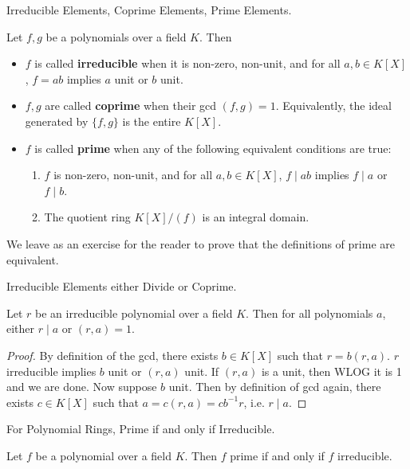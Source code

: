 \documentclass[../../book.tex]{subfiles}
\begin{document}
\begin{dfn} Irreducible Elements, Coprime Elements, Prime Elements.
    
    Let $f, g$ be a polynomials over a field $K$. 
    Then \begin{itemize}
        \item $f$ is called \textbf{irreducible} when it is non-zero, non-unit, and
            for all $a, b \in K[X]$, $f = a b$ implies $a$ unit or $b$ unit.
        \item $f, g$ are called \textbf{coprime} when their gcd $(f,g) = 1$.
            Equivalently, the ideal generated by $\{f,g\}$ is the entire $K[X]$.
        \item $f$ is called \textbf{prime} when any of the following 
            equivalent conditions are true: 
            \begin{enumerate}
                \item $f$ is non-zero, non-unit, and for all $a, b \in K[X]$, 
                $f \mid ab$ implies $f \mid a$ or $f \mid b$.
                \item The quotient ring $K[X]/(f)$ is an integral domain.
            \end{enumerate}
    \end{itemize}
    We leave as an exercise for the reader to prove that
    the definitions of prime are equivalent. 
\end{dfn}
\begin{lem} Irreducible Elements either Divide or Coprime.
    
    Let $r$ be an irreducible polynomial over a field $K$.
    Then for all polynomials $a$, either $r \mid a$ or $(r,a) = 1$.
\end{lem}
\begin{proof}
    By definition of the gcd, there exists $b \in K[X]$ such that $r = b(r,a)$.
    $r$ irreducible implies $b$ unit or $(r,a)$ unit. 
    If $(r,a)$ is a unit, then WLOG it is 1 and we are done.
    Now suppose $b$ unit. Then by definition of gcd again, 
    there exists $c \in K[X]$ such that $a = c(r,a) = cb^{-1}r$, 
    i.e. $r \mid a$. 
\end{proof}
\begin{thm} For Polynomial Rings, Prime if and only if Irreducible.
    
    Let $f$ be a polynomial over a field $K$. 
    Then $f$ prime if and only if $f$ irreducible.
\end{thm}
\end{document}
